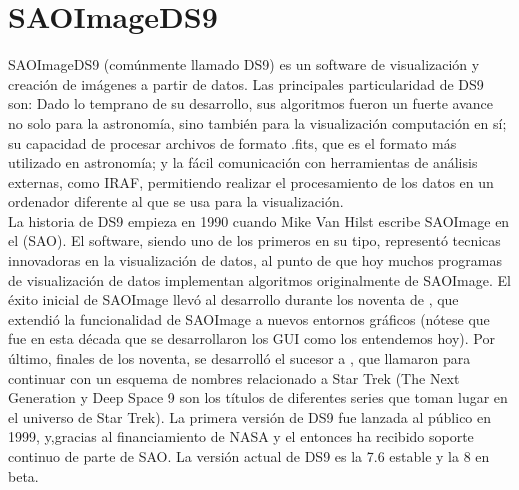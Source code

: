 \documentclass[12pt]{article}
\begin{document}
\section{SAOImageDS9}
SAOImageDS9 (comúnmente llamado DS9) es un software de visualización y creación de imágenes a partir de datos. Las principales particularidad de DS9 son: Dado lo temprano de su desarrollo, sus algoritmos fueron un fuerte avance no solo para la astronomía, sino también para la visualización computación en sí; su capacidad de procesar archivos de formato .fits, que es el formato más utilizado en astronomía; y la fácil comunicación con herramientas de análisis externas, como IRAF, permitiendo realizar el procesamiento de los datos en un ordenador diferente al que se usa para la visualización.\\
La historia de DS9 empieza en 1990 cuando Mike Van Hilst escribe SAOImage en el  (SAO). El software, siendo uno de los primeros en su tipo, representó tecnicas innovadoras en la visualización de datos, al punto de que hoy muchos programas de visualización de datos implementan algoritmos originalmente de SAOImage. El éxito inicial de SAOImage llevó al desarrollo durante los noventa de , que extendió la funcionalidad de SAOImage a nuevos entornos gráficos (nótese que fue en esta década que se desarrollaron los GUI como los entendemos hoy). Por último, finales de los noventa, se desarrolló el sucesor a , que llamaron  para continuar con un esquema de nombres relacionado a Star Trek (The Next Generation y Deep Space 9 son los títulos de diferentes series que toman lugar en el universo de Star Trek). La primera versión de DS9 fue lanzada al público en 1999, y,gracias al financiamiento de NASA y el  entonces ha recibido soporte continuo de parte de SAO. La versión actual de DS9 es la 7.6 estable y la 8 en beta.\cite{ds9}
\end{document}
